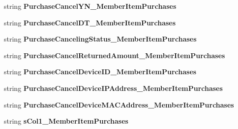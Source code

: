 \begin{DoxyCompactItemize}
\item 
string {\bfseries Purchase\+Cancel\+Y\+N\+\_\+\+Member\+Item\+Purchases}\hypertarget{a00113_a8db3fb9c50b07e2107c9eed948cf77a2}{}\label{a00113_a8db3fb9c50b07e2107c9eed948cf77a2}

\item 
string {\bfseries Purchase\+Cancel\+D\+T\+\_\+\+Member\+Item\+Purchases}\hypertarget{a00113_af40bfd2b12c504fd5e0e55fc87351d33}{}\label{a00113_af40bfd2b12c504fd5e0e55fc87351d33}

\item 
string {\bfseries Purchase\+Canceling\+Status\+\_\+\+Member\+Item\+Purchases}\hypertarget{a00113_a8e42a943dbf62bf7af0bdfd680ffa51b}{}\label{a00113_a8e42a943dbf62bf7af0bdfd680ffa51b}

\item 
string {\bfseries Purchase\+Cancel\+Returned\+Amount\+\_\+\+Member\+Item\+Purchases}\hypertarget{a00113_a8240fd6490deb55e4b2fb444bc91e811}{}\label{a00113_a8240fd6490deb55e4b2fb444bc91e811}

\item 
string {\bfseries Purchase\+Cancel\+Device\+I\+D\+\_\+\+Member\+Item\+Purchases}\hypertarget{a00113_a6ef57917c4ceac6a7fae33c098ba15ea}{}\label{a00113_a6ef57917c4ceac6a7fae33c098ba15ea}

\item 
string {\bfseries Purchase\+Cancel\+Device\+I\+P\+Address\+\_\+\+Member\+Item\+Purchases}\hypertarget{a00113_a40ccc979d86434c0afb18952a761968c}{}\label{a00113_a40ccc979d86434c0afb18952a761968c}

\item 
string {\bfseries Purchase\+Cancel\+Device\+M\+A\+C\+Address\+\_\+\+Member\+Item\+Purchases}\hypertarget{a00113_a16577cdb3c8890f5440a7559a7eb2606}{}\label{a00113_a16577cdb3c8890f5440a7559a7eb2606}

\item 
string {\bfseries s\+Col1\+\_\+\+Member\+Item\+Purchases}\hypertarget{a00113_a84b178c45d892cae55c19a5a825b5c1e}{}\label{a00113_a84b178c45d892cae55c19a5a825b5c1e}


\end{DoxyCompactItemize}
